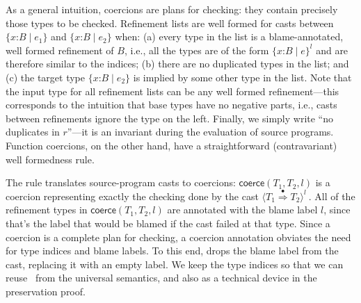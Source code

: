 \documentclass[9pt]{extarticle}
\newcommand{\ottnt}[1]{\mathit{#1}}
\begin{document}
As a general intuition, coercions are plans for checking: they contain
precisely those types to be checked.
Refinement lists are well formed for casts between $ \{ \mathit{x} \mathord{:} \ottnt{B} \mathrel{\mid} \ottnt{e_{{\mathrm{1}}}} \} $ and
$ \{ \mathit{x} \mathord{:} \ottnt{B} \mathrel{\mid} \ottnt{e_{{\mathrm{2}}}} \} $ when: (a) every type in the list is a blame-annotated,
well formed refinement of $\ottnt{B}$, i.e., all the types are of the form
$ \{ \mathit{x} \mathord{:} \ottnt{B} \mathrel{\mid} \ottnt{e} \}^{ \ottnt{l} } $ and are therefore similar to the indices; (b) there
are no duplicated types in the list; and (c) the target type
$ \{ \mathit{x} \mathord{:} \ottnt{B} \mathrel{\mid} \ottnt{e_{{\mathrm{2}}}} \} $ is implied by some other type in the list.
Note that the input type for all refinement lists can be any well
formed refinement---this corresponds to the intuition that base types
have no negative parts, i.e., casts between refinements ignore the
type on the left.
Finally, we simply write ``no duplicates in $\ottnt{r}$''---it is an
invariant during the evaluation of source programs.
Function coercions, on the other hand, have a straightforward
(contravariant) well formedness rule.

The  rule translates source-program casts to coercions:
$ \mathsf{coerce} ( \ottnt{T_{{\mathrm{1}}}} , \ottnt{T_{{\mathrm{2}}}} , \ottnt{l} ) $ is a coercion representing exactly the
checking done by the cast $ \langle  \ottnt{T_{{\mathrm{1}}}}  \mathord{ \overset{\bullet}{\Rightarrow} }  \ottnt{T_{{\mathrm{2}}}}  \rangle^{ \ottnt{l} } ~     $\!\!. All of the refinement
types in $ \mathsf{coerce} ( \ottnt{T_{{\mathrm{1}}}} , \ottnt{T_{{\mathrm{2}}}} , \ottnt{l} ) $ are annotated with the blame label
$\ottnt{l}$, since that's the label that would be blamed if the cast
failed at that type.
Since a coercion is a complete plan for checking, a coercion
annotation obviates the need for type indices and blame labels. To
this end,  drops the blame label from the cast, replacing it
with an empty label. We keep the type indices so that we can reuse
\ECastMerge\ from the universal semantics, and also as a technical
device in the preservation proof.
\end{document}
